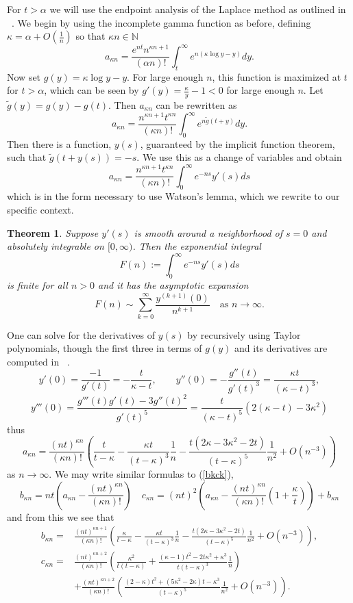 \documentclass[12pt]{amsart}
\newtheorem{theorem}{Theorem}
\theoremstyle{remark}
\begin{document}
For $t>\alpha$ we will use the endpoint analysis of the Laplace method as outlined in ~\cite[\S3.3]{Miller}.  We begin by using the incomplete gamma function as before, defining $\kappa=\alpha+O(\frac{1}{n})$ so that $\kappa n\in\mathbb{N}$
\[a_{\kappa n}=\frac{e^{nt}n^{\kappa n+1}}{(\alpha n)!}\int_{t}^\infty e^{n(\kappa\log y-y)}dy.\]
Now set $g(y)=\kappa\log y-y$.  For large enough $n$, this function is maximized at $t$ for $t>\alpha$, which can be seen by $g'(y)=\frac{\kappa}{y}-1<0$ for large enough $n$.  Let $\tilde{g}(y)=g(y)-g(t)$.  Then $a_{\kappa n}$ can be rewritten as
\[a_{\kappa n}=\frac{n^{\kappa n+1}t^{\kappa n}}{(\kappa n)!}\int_{0}^\infty e^{n\tilde{g}(t+y)}dy.\]
Then there is a function, $y(s)$, guaranteed by the implicit function theorem, such that $\tilde{g}(t+y(s))=-s$.  We use this as a change of variables and obtain
\[a_{\kappa n}=\frac{n^{\kappa n+1}t^{\kappa n}}{(\kappa n)!}\int_{0}^\infty e^{-ns}y'(s)ds\]
which is in the form necessary to use Watson's lemma, which we rewrite to our specific context.
\begin{theorem}
	Suppose $y'(s)$ is smooth around a neighborhood of $s=0$ and absolutely integrable on $[0,\infty)$.  Then the 
	exponential integral
	\[F(n):=\int_0^\infty e^{-ns}y'(s)ds\]
	is finite for all $n>0$ and it has the asymptotic expansion
	\[F(n)\sim\sum_{k=0}^\infty\frac{y^{(k+1)}(0)}
	{n^{k+1}}\quad\text{as $n\rightarrow\infty$.}\]
\end{theorem}
One can solve for the derivatives of $y(s)$ by recursively using Taylor polynomials, though the first three in terms of $g(y)$ and its derivatives are computed in ~\cite{Miller}.
\[y'(0)=\frac{-1}{g'(t)}=-\frac{t}{\kappa-t},\qquad y''(0)=-\frac{g''(t)}{g'(t)^3}=\frac{\kappa t}{(\kappa-t)^3},\]
\[y'''(0)=\frac{g'''(t)g'(t)-3g''(t)^2}{g'(t)^5}=\frac{t}{(\kappa-t)^5}\left(2(\kappa-t)-3\kappa^2\right)\]
thus
\begin{equation}\label{Milleran}
	a_{\kappa n}=\frac{(nt)^{\kappa n}}{(\kappa n)!}
	\left(\frac{t}{t-\kappa}-\frac{\kappa t}{(t-\kappa)^3}\frac{1}{n}
	-\frac{t(2\kappa-3\kappa^2-2t)}{(t-\kappa)^5}\frac{1}{n^2}+O(n^{-3})\right)
\end{equation}
as $n\rightarrow\infty$.  We may write similar formulas to (\ref{bkck}),
\[b_{\kappa n}=nt\left(a_{\kappa n}-\frac{(nt)^{\kappa n}}{(\kappa n)!}\right)\quad c_{\kappa n}=(nt)^2\left(a_{\kappa n}-\frac{(nt)^{\kappa n}}{(\kappa n)!}\left(1+\frac{\kappa}{t}\right)\right)+b_{\kappa n}\]
and from this we see that
\begin{align}
	b_{\kappa n}=&\frac{(nt)^{\kappa n+1}}{(\kappa n)!}
		\left(\frac{\kappa}{t-\kappa}-\frac{\kappa t}{(t-\kappa)^3}\frac{1}{n}
		-\frac{t(2\kappa-3\kappa^2-2t)}{(t-\kappa)^5}\frac{1}{n^2}
		+O(n^{-3})\right),	
		\label{Millerbn}
	\\c_{\kappa n}=&\frac{(nt)^{\kappa n+2}}{(\kappa n)!}
		\left(\frac{\kappa^2}{t(t-\kappa)}+\frac{(\kappa-1)t^2-2t\kappa^2
		+\kappa^3}{t(t-\kappa)^3}\frac{1}{n}\right)
		\label{Millercn}
	\\ &+\frac{(nt)^{\kappa n+2}}{(\kappa n)!}
		\left(\frac{(2-\kappa)t^2+(5\kappa^2-2\kappa) t-\kappa^3}{(t-\kappa)^5}
		\frac{1}{n^2}+O(n^{-3})\right).\nonumber
\end{align}
\end{document}
